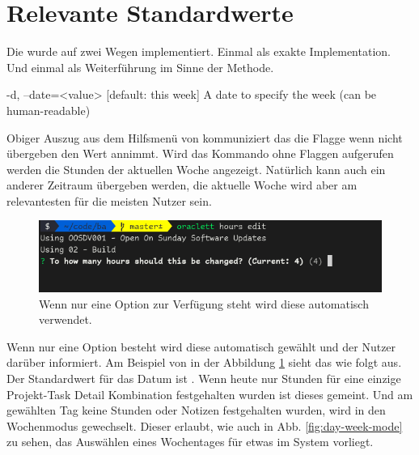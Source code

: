 \documentclass[oneside,bibliography=totocnumbered,BCOR=5mm]{scrbook}
\newenvironment{code}{\captionsetup{type=listing, skip=0pt}}{}
\begin{document}
\section{Relevante Standardwerte}
\label{sec:impl_defaults}


Die  wurde auf zwei Wegen implementiert. Einmal als
exakte Implementation. Und einmal als Weiterführung im Sinne der Methode.

\begin{code}
  \begin{shellcode}
-d, --date=<value>  [default: this week] A date to specify the week (can be human-readable)
  \end{shellcode}
  \medskip
\end{code}

Obiger Auszug aus dem Hilfsmenü von  kommuniziert das
die  Flagge wenn nicht übergeben den Wert  annimmt. Wird das Kommando  ohne Flaggen aufgerufen
werden die Stunden der aktuellen Woche angezeigt. Natürlich kann auch ein
anderer Zeitraum übergeben werden, die aktuelle Woche wird aber am relevantesten
für die meisten Nutzer sein.

\medskip

\begin{figure}
  \centering
  \includegraphics[scale=0.5]{hours-edit-defaults.png}
  \caption{Wenn nur eine Option zur Verfügung steht wird diese automatisch verwendet.}
  \label{fig:hours-edit-defaults}
\end{figure}

Wenn nur eine Option besteht wird diese automatisch gewählt und der Nutzer
darüber informiert. Am Beispiel von  in der Abbildung
\ref{fig:hours-edit-defaults} sieht das wie folgt aus. Der Standardwert für
das Datum ist . Wenn heute nur Stunden für eine einzige
Projekt-Task Detail Kombination festgehalten wurden ist dieses gemeint. Und
am gewählten Tag keine Stunden oder Notizen festgehalten wurden, wird in den
Wochenmodus gewechselt. Dieser erlaubt, wie auch in Abb. \ref{fig:day-week-mode}
zu sehen, das Auswählen eines Wochentages für etwas im System vorliegt.
\end{document}
